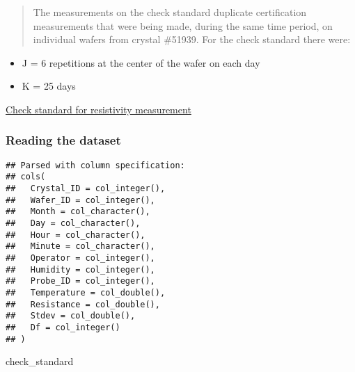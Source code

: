 \documentclass[]{book}
\newenvironment{Shaded}{\begin{snugshade}}{\end{snugshade}}
\newcommand{\DataTypeTok}[1]{\textcolor[rgb]{0.13,0.29,0.53}{#1}}
\newcommand{\KeywordTok}[1]{\textcolor[rgb]{0.13,0.29,0.53}{\textbf{#1}}}
\newcommand{\NormalTok}[1]{#1}
\newcommand{\OperatorTok}[1]{\textcolor[rgb]{0.81,0.36,0.00}{\textbf{#1}}}
\newcommand{\OtherTok}[1]{\textcolor[rgb]{0.56,0.35,0.01}{#1}}
\newcommand{\StringTok}[1]{\textcolor[rgb]{0.31,0.60,0.02}{#1}}
\providecommand{\tightlist}{%
  \setlength{\itemsep}{0pt}\setlength{\parskip}{0pt}}
\theoremstyle{definition}
\theoremstyle{definition}
\theoremstyle{definition}
\theoremstyle{remark}
\begin{document}
\begin{quote}
The measurements on the check standard duplicate certification
measurements that were being made, during the same time period, on
individual wafers from crystal \#51939. For the check standard there
were:
\end{quote}

\begin{itemize}
\tightlist
\item
  J = 6 repetitions at the center of the wafer on each day
\item
  K = 25 days
\end{itemize}

\href{https://www.itl.nist.gov/div898/handbook/mpc/section6/mpc62.htm}{Check
standard for resistivity measurement}

\hypertarget{reading-the-dataset}{%
\subsubsection{Reading the dataset}\label{reading-the-dataset}}

\begin{Shaded}
\end{Shaded}

\begin{verbatim}
## Parsed with column specification:
## cols(
##   Crystal_ID = col_integer(),
##   Wafer_ID = col_integer(),
##   Month = col_character(),
##   Day = col_character(),
##   Hour = col_character(),
##   Minute = col_character(),
##   Operator = col_integer(),
##   Humidity = col_integer(),
##   Probe_ID = col_integer(),
##   Temperature = col_double(),
##   Resistance = col_double(),
##   Stdev = col_double(),
##   Df = col_integer()
## )
\end{verbatim}

\begin{Shaded}
\begin{Highlighting}[]
\NormalTok{check_standard}
\end{Highlighting}
\end{Shaded}
\end{document}
